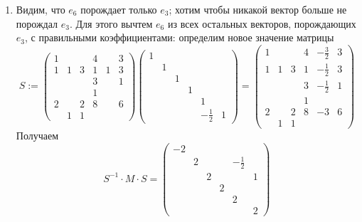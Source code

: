 \documentclass[12pt,a4paper]{article}
\begin{document}
\begin{problem*}
\begin{enumerate}
            \item Видим, что $e_6$ порождает только $e_3$; хотим чтобы никакой вектор больше не порождал $e_3$. Для этого вычтем $e_6$ из всех остальных векторов, порождающих $e_3$, с правильными коэффициентами: определим новое значение матрицы
                \[
                    S :=
                    \begin{pmatrix}
                        1&&& 4&& 3\\
                        1& 1& 3& 1& 1& 3\\
                        &&& 3&& 1\\
                        &&& 1&&\\
                        2&&2& 8&& 6\\
                        &1&1&&&
                    \end{pmatrix}
                    \begin{pmatrix}
                        1&&&&&\\
                        &1&&&&\\
                        &&1&&&\\
                        &&&1&&\\
                        &&&&1&\\
                        &&&&-\frac{1}{2}&1
                    \end{pmatrix}
                    =
                    \begin{pmatrix}
                        1&&& 4& -\frac{3}{2}& 3\\
                        1& 1& 3& 1& -\frac{1}{2}& 3\\
                        &&& 3& -\frac{1}{2}& 1\\
                        &&& 1&&\\
                        2&& 2& 8& -3& 6\\
                        & 1& 1&&&
                    \end{pmatrix}
                \]
                Получаем
                \[
                    S^{-1} \cdot M \cdot S =
                    \begin{pmatrix}
                        -2&&&&&\\
                        &2&&&-\frac{1}{2}&\\
                        &&2&&&1\\
                        &&&2&&\\
                        &&&&2&\\
                        &&&&&2 
                    \end{pmatrix}
                \]


\end{enumerate}
\end{problem*}
\end{document}
